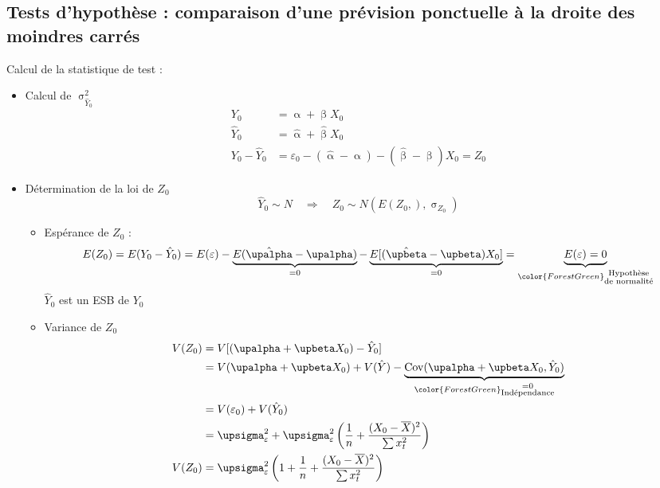 \documentclass{article}
\newcommand{\hbeta}{\hat{\upbeta}}
\newcommand{\halpha}{\hat{\upalpha}}
\newcommand{\sig}{\upsigma_\varepsilon^2}
\begin{document}
 \subsection{Tests d'hypothèse : comparaison d'une prévision ponctuelle à la droite des moindres carrés}
Calcul de la statistique de test : 
\begin{itemize}
	\item Calcul de $\upsigma^2_{\hat{Y}_0}$
	\begin{equation*}
		\begin{split}
			Y_0 &= \upalpha + \upbeta X_0 \\
			\hat{Y}_0 &= \halpha + \hbeta X_0 \\
			Y_0 - \hat{Y}_0 &= \varepsilon_0 - (\halpha - \upalpha) - (\hbeta - \upbeta) X_0 = Z_0
 		\end{split}
	\end{equation*}
	\item Détermination de la loi de $Z_0$
	\begin{equation*}
		\hat{Y}_0 \sim  N \quad  \Rightarrow  \quad Z_0 \sim N(E(Z_0,) , \upsigma_{Z_0})
	\end{equation*}
	\begin{itemize}
		\item Espérance de $Z_0$ : 
		\begin{equation*}
			E(Z_0) = E(Y_0 - \hat{Y}_0) = E(\varepsilon) - \underbrace{E(\halpha - \upalpha)}_{=0} - \underbrace{E[(\hbeta - \upbeta) X_0]}_{=0}= \underbrace{E(\varepsilon) = 0}_{\color{ForestGreen}\substack{\text{Hypothèse} \\ \textrm{de normalité}}}
		\end{equation*}
		$\hat{Y}_0$ est un ESB de $Y_0$
		\item Variance de $Z_0$
		\begin{equation*}
			\begin{split}
				V(Z_0) &= V [(\upalpha + \upbeta X_0) -\hat{Y}_0] \\
				&= V(\upalpha + \upbeta X_0) + V(\hat{Y}) - \underbrace{\operatorname{Cov} (\upalpha + \upbeta X_0, \hat{Y}_0)}_{\color{ForestGreen}\substack{=0 \\ \textrm{Indépendance}}} \\ 
				&= V(\varepsilon_0) + V(\hat{Y}_0) \\
				&= \sig  + \sig \left(\frac{1}{n} + \frac{(X_0-\overline{X})^2}{\sum x_t^2}\right)\\
				V(Z_0) &= \sig \left(1 + \frac{1}{n} + \frac{(X_0 - \overline{X})^2}{\sum x_t^2}\right)
			\end{split} 
		\end{equation*}
	\end{itemize}
\end{itemize}
\end{document}
